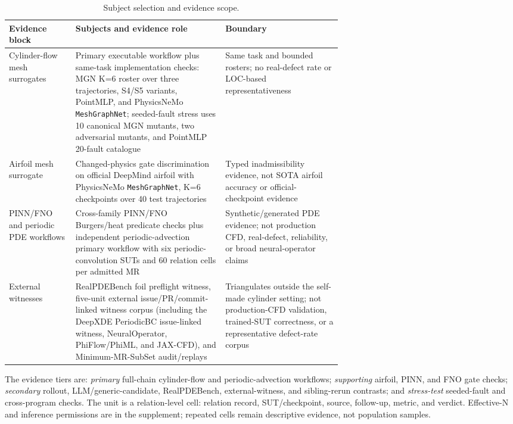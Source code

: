 \documentclass[preprint,12pt,authoryear]{elsarticle}
\begin{document}
\begin{table}[!htbp]
\centering
\caption{Subject selection and evidence scope.}
\label{tab:subject-scope}
\scriptsize
\renewcommand{\arraystretch}{0.9}
\setlength{\tabcolsep}{3pt}
\begin{tabularx}{\linewidth}{@{}>{\raggedright\arraybackslash}p{0.20\linewidth}>{\raggedright\arraybackslash}p{0.45\linewidth}Y@{}}
\toprule
\textbf{Evidence block} & \textbf{Subjects and evidence role} & \textbf{Boundary} \\
\midrule
Cylinder-flow mesh surrogates & Primary executable workflow plus same-task implementation checks: MGN K=6 roster over three trajectories, S4/S5 variants, PointMLP, and PhysicsNeMo \texttt{MeshGraphNet}; seeded-fault stress uses 10 canonical MGN mutants, two adversarial mutants, and PointMLP 20-fault catalogue & Same task and bounded rosters; no real-defect rate or LOC-based representativeness \\
Airfoil mesh surrogate & Changed-physics gate discrimination on official DeepMind airfoil with PhysicsNeMo \texttt{MeshGraphNet}, K=6 checkpoints over 40 test trajectories & Typed inadmissibility evidence, not SOTA airfoil accuracy or official-checkpoint evidence \\
PINN/FNO and periodic PDE workflows & Cross-family PINN/FNO Burgers/heat predicate checks plus independent periodic-advection primary workflow with six periodic-convolution SUTs and 60 relation cells per admitted MR & Synthetic/generated PDE evidence; not production CFD, real-defect, reliability, or broad neural-operator claims \\
External witnesses & RealPDEBench foil preflight witness, five-unit external issue/PR/commit-linked witness corpus (including the DeepXDE PeriodicBC issue-linked witness, NeuralOperator, PhiFlow/PhiML, and JAX-CFD), and Minimum-MR-SubSet audit/replays & Triangulates outside the self-made cylinder setting; not production-CFD validation, trained-SUT correctness, or a representative defect-rate corpus \\
\bottomrule
\end{tabularx}
\end{table}

The evidence tiers are: \emph{primary} full-chain cylinder-flow and periodic-advection workflows; \emph{supporting} airfoil, PINN, and FNO gate checks; \emph{secondary} rollout, LLM/generic-candidate, RealPDEBench, external-witness, and sibling-rerun contrasts; and \emph{stress-test} seeded-fault and cross-program checks. The unit is a relation-level cell: relation record, SUT/checkpoint, source, follow-up, metric, and verdict. Effective-N and inference permissions are in the supplement; repeated cells remain descriptive evidence, not population samples.
\end{document}
